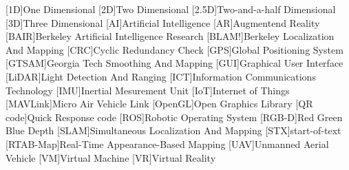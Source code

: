 \begin{acronym}
  [1D]{One Dimensional}
  [2D]{Two Dimensional}
  [2.5D]{Two\hyp{}and\hyp{}a\hyp{}half Dimensional}
  [3D]{Three Dimensional}
  [AI]{Artificial Intelligence}
  [AR]{Augmentend Reality}
  [BAIR]{Berkeley Artificial Intelligence Research}
  [BLAM!]{Berkeley Localization And Mapping}
  [CRC]{Cyclic Redundancy Check}
  [GPS]{Global Positioning System}
  [GTSAM]{Georgia Tech Smoothing And Mapping}
  [GUI]{Graphical User Interface}
  [LiDAR]{Light Detection And Ranging}
  [ICT]{Information Communications Technology}
  [IMU]{Inertial Mesurement Unit}
  [IoT]{Internet of Things}
  [MAVLink]{Micro Air Vehicle Link}
  [OpenGL]{Open Graphics Library}
  [QR code]{Quick Response code}
  [ROS]{Robotic Operating System}
  [RGB\hyp{}D]{Red Green Blue Depth}
  [SLAM]{Simultaneous Localization And Mapping}
  [STX]{start\hyp{}of\hyp{}text}
  [RTAB\hyp{}Map]{Real\hyp{}Time Appearance\hyp{}Based Mapping}
  [UAV]{Unmanned Aerial Vehicle}
  [VM]{Virtual Machine}
  [VR]{Virtual Reality}
\end{acronym}